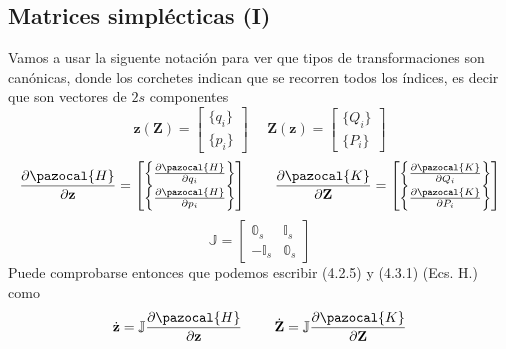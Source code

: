 \subsection{Matrices simplécticas (I)}
Vamos a usar la siguente notación para ver que tipos de transformaciones son canónicas, donde los corchetes indican que se recorren todos los índices, es decir que son vectores de $2s$ componentes
\begin{equation} \label{4.2.7}
    \mathbf{z}(\mathbf{Z})=\left[\begin{matrix} \{q_i\}\\ \{p_i\}\end{matrix}\right] \ \ \ \ \ \ \mathbf{Z}(\mathbf{z})=\left[\begin{matrix} \{Q_i\}\\ \{P_i\}\end{matrix}\right]
\end{equation} 
\begin{equation} \label{4.2.7}
    \frac{\partial \pazocal{H}}{\partial \mathbf{z}}=\left[\begin{matrix} \left\{\frac{\partial \pazocal{H}}{\partial q_i}\right\} \\ \left\{\frac{\partial \pazocal{H}}{\partial p_i}\right\}\end{matrix}\right] \ \ \ \ \ \ \frac{\partial \pazocal{K}}{\partial \mathbf{Z}}=\left[\begin{matrix} \left\{\frac{\partial \pazocal{K}}{\partial Q_i}\right\} \\ \left\{\frac{\partial \pazocal{K}}{\partial P_i}\right\}\end{matrix}\right]
\end{equation} 
\begin{equation} \label{4.2.7}
    \mathbb{J} = \left[\begin{array}{c|c} \mathbb{0}_s & \mathbb{I}_s \\ \hline -\mathbb{I}_s & \mathbb{0}_s \end{array}\right]
\end{equation} 
Puede comprobarse entonces que podemos escribir (4.2.5) y (4.3.1) (Ecs. H.) como
\begin{equation} \label{4.2.7}
    \dot{\mathbf{z}} = \mathbb{J} \frac{\partial \pazocal{H}}{\partial \mathbf{z}} \ \ \ \ \ \ \ \dot{\mathbf{Z}} = \mathbb{J} \frac{\partial \pazocal{K}}{\partial \mathbf{Z}}
\end{equation} 
